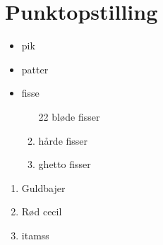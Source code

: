 \chapter{Punktopstilling}
\begin{itemize}
\item pik
\item patter
\item fisse
\begin{enumerate}
\item[22] bløde fisser
\item hårde fisser
\item ghetto fisser
\end{enumerate}
\end{itemize}

\begin{enumerate}[label=\roman*.]
\item Guldbajer
\item Rød cecil
\item itamss
\end{enumerate}
